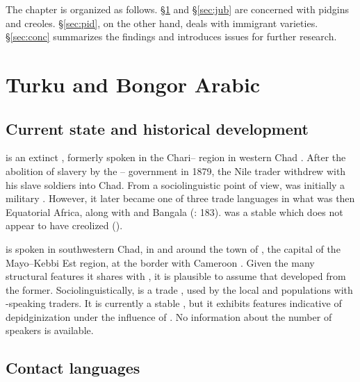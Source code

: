 \documentclass[output=paper]{langsci/langscibook}
\begin{document}
  The chapter is organized as follows. §\ref{sec:tur} and §\ref{sec:jub} are concerned with  pidgins and creoles. §\ref{sec:pid}, on the other hand, deals with  immigrant varieties. §\ref{sec:conc} summarizes the findings and introduces issues for further research.


 \section{Turku and Bongor Arabic}\label{sec:tur}


 \subsection{Current state and historical development}


 is an extinct , formerly spoken in the Chari-- region in western Chad \citep{Muraz1926}. After the abolition of slavery by the -- government in 1879, the Nile  trader  withdrew with his slave soldiers into Chad. From a sociolinguistic point of view,  was initially a military . However, it later became one of three trade languages in what was then  Equatorial Africa, along with  and Bangala (\citealt{ToscoOwens1993}: 183).  was a stable  which does not appear to have creolized (\citealt{ToscoOwens1993}).

  is spoken in southwestern Chad, in and around the town of , the capital of the Mayo--Kebbi Est region, at the border with Cameroon \citep{Luffin2013}. Given the many structural features it shares with , it is plausible to assume that   developed from the former. Sociolinguistically,   is a trade , used by the local  and  populations with -speaking traders. It is currently a stable , but it exhibits features indicative of depidginization under the influence of  . No information about the number of speakers is available.


 
 \subsection{Contact languages}
\end{document}
